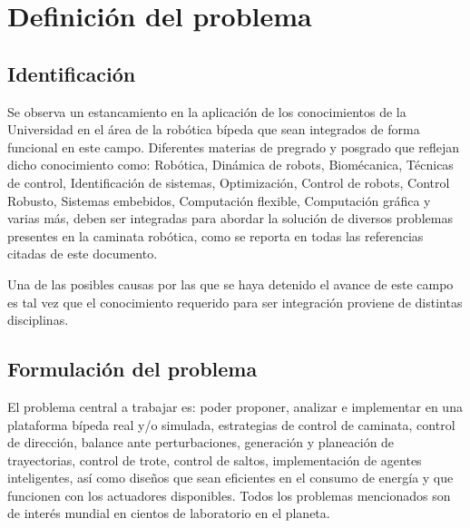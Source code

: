 \section[Def. Problema]{Definici\'on del problema}
\label{sec:problema}

\subsection[Identificaci\'on]{Identificaci\'on}
Se observa un estancamiento en la aplicaci\'on de los conocimientos de la Universidad en el \'area de la rob\'otica b\'ipeda que sean integrados de forma funcional en este campo. Diferentes materias de pregrado y posgrado que reflejan dicho conocimiento como: Rob\'otica, Din\'amica de robots, Biom\'ecanica, T\'ecnicas de control, Identificaci\'on de sistemas, Optimizaci\'on, Control de robots, Control Robusto, Sistemas embebidos, Computaci\'on flexible, Computaci\'on gr\'afica y varias m\'as, deben ser integradas para abordar la soluci\'on de diversos problemas presentes en la caminata rob\'otica, como se reporta en todas las referencias citadas de este documento.\par
Una de las posibles causas por las que se haya detenido el avance de este campo es tal vez que el conocimiento requerido para ser integraci\'on proviene de distintas disciplinas.\par

\subsection[Formulaci\'on]{Formulaci\'on del problema}
El problema central a trabajar es: poder proponer, analizar e implementar en una plataforma b\'ipeda real y/o simulada, estrategias de control de caminata, control de direcci\'on, balance ante perturbaciones, generaci\'on y planeaci\'on de trayectorias, control de trote, control de saltos, implementaci\'on de agentes inteligentes, as\'i como dise\~nos que sean eficientes en el consumo de energ\'ia y que funcionen con los actuadores disponibles. Todos los problemas mencionados son de inter\'es mundial en cientos de laboratorio en el planeta.

